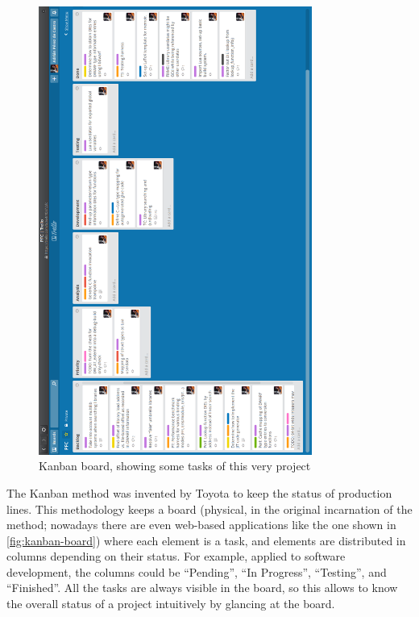 \begin{figure}[htH]
	\centering
	\includegraphics[width=0.8\textwidth]{img/trello-board.png}
	\caption{Kanban board, showing some tasks of this very project}
	\label{fig:kanban-board}
\end{figure}

The Kanban method was invented by \gls{Toyota} to keep the status of
production lines. This methodology keeps a board (physical, in the original
incarnation of the method; nowadays there are even web-based applications like
the one shown in \autoref{fig:kanban-board}) where each element is a task, and
elements are distributed in columns depending on their status. For example,
applied to software development, the columns could be “Pending”, “In
Progress”, “Testing”, and “Finished”. All the tasks are always visible in the
board, so this allows to know the overall status of a project intuitively by
glancing at the board.


\beforeintro
